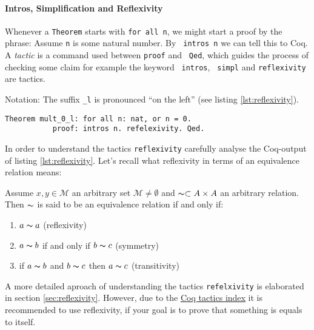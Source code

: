 	    \paragraph{Intros, Simplification and Reflexivity}
	     Whenever a \lstinline!Theorem! starts with \lstinline!for all n!, we might start a proof by the phrase:
	     Assume \lstinline!n! is some natural number. By \lstinline! intros n! we can tell this to Coq.\\
	     A {\itshape tactic} is a command used between \lstinline!proof! and \lstinline! Qed!, 
	     which guides the process of checking some claim for example the keyword \lstinline! intros!, \lstinline! simpl! and \lstinline!reflexivity! 
	     are tactics.     
	      \begin{remark}{Notation:} 
	     The suffix \lstinline!_l! is pronounced ``on the left'' (see listing \ref{lst:reflexivity}). 
	 	 \begin{lstlisting}[caption = \lstinline!mult_0_l!, label= {lst:reflexivity}]
		 Theorem mult_0_l: for all n: nat, or n = 0.
		   proof: intros n. refelexivity. Qed.
		 \end{lstlisting}
		 \end{remark} 
	      
	    In order to understand the tactics \lstinline!reflexivity! carefully analyse the Coq-output of listing \ref{lst:reflexivity}.   
	    Let's recall what reflexivity in terms of an equivalence relation means: 
	   \begin{definition}
	   Assume $x,y\in \mathcal{M}$ an arbitrary set $\mathcal{M}\neq\emptyset$ and $\thicksim\subset A \times A $ an arbitrary relation.
	   Then $\thicksim$ is said to be an equivalence relation if and only if:
	   \begin{enumerate}
	   \item $a\thicksim a$ (reflexivity)
	   \item $a \thicksim b$ if and only if $b \thicksim c$ (symmetry)
	   \item if $a \thicksim b$ and $ b\thicksim c$ then $a \thicksim c$ (transitivity) 
	   \end{enumerate}
	   \end{definition}
	     
	    A more detailed aproach of understanding the tactics \lstinline!refelxivity! is elaborated in section \ref{sec:reflexivity}.  
	    However, due to the \href{https://pjreddie.com/coq-tactics/}{Coq tactics index} it is recommended to use reflexivity, if your goal is to prove that something is equals to itself.  
	      
